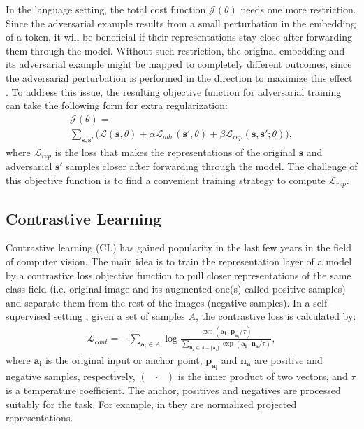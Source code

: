 \documentclass[letterpaper]{article} %
\begin{document}
In the language setting, the total cost function $\mathcal{J}(\theta)$ needs one more restriction. Since the adversarial example results from a small perturbation in the embedding of a token, it will be beneficial if their representations stay close after forwarding them through the model. Without such restriction, the original embedding and its adversarial example might be mapped to completely different outcomes, since the adversarial perturbation is performed in the direction to maximize this effect \cite{cheng2018towards, cheng2019robust}. To address this issue, the resulting objective function for adversarial training can take the following form for extra regularization:
\begin{multline} \label{cost}
        \mathcal{J}(\theta) = \\ \sum_{\mathbf{s}, \mathbf{s'}} \bigg( \mathcal{L}(\mathbf{s}, \theta) +  \alpha  \mathcal{L}_{adv}(\mathbf{s'}, \theta) + \beta \mathcal{L}_{rep}(\mathbf{s}, \mathbf{s'}; \theta) \bigg),
\end{multline} 
 where $\mathcal{L}_{rep}$ is the loss that makes the representations of the original $\mathbf{s}$ and adversarial $\mathbf{s'}$ samples closer after forwarding through the model. The challenge of this objective function is to find a convenient training strategy to compute $\mathcal{L}_{rep}$.

\subsection{Contrastive Learning}

Contrastive learning (CL) has gained popularity in the last few years in the field of computer vision. The main idea is to train the representation layer of a model by a contrastive loss objective function \cite{chopra2005learning} to pull closer representations of the same class field (i.e. original image and its augmented one(s) called positive samples) and separate them from the rest of the images (negative samples). 
In a self-supervised setting \cite{wu2018unsupervised, henaff2020data, hjelm2018learning, tian2020contrastive, chen2020simple, he2020momentum}, given a set of samples $A$, the contrastive loss is calculated by:
\begin{multline} \label{cl}
    \mathcal{L}_{cont} = - \sum_{\mathbf{a}_i \in A} \log \frac{ \exp(\mathbf{a_i} \cdot \mathbf{p_{a_i}} / \tau)}{\sum_{\mathbf{n_a} \in A -\{\mathbf{a}_i\}} \exp(\mathbf{a_i} \cdot \mathbf{n_a} /\tau)},
\end{multline}
where $\mathbf{a_i}$ is the original input or anchor point, $\mathbf{p_{a_i}}$ and $\mathbf{n_a}$  are positive and negative samples, respectively, $(\text{  } \cdot \text{  })$ is the inner product of two vectors, and $\tau$ is a temperature coefficient. The anchor, positives and negatives are processed suitably for the task. For example, in \cite{khosla2020supervised} they are normalized projected representations. 
\end{document}
